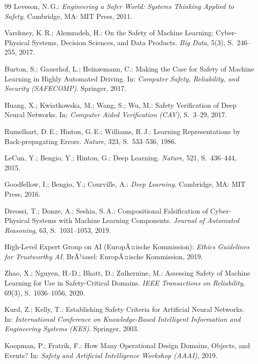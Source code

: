﻿\documentclass[12pt,a4paper]{article}
\begin{document}
\begin{thebibliography}{99}
Leveson, N.\,G.:
\textit{Engineering a Safer World: Systems Thinking Applied to Safety}.
Cambridge, MA: MIT Press, 2011.

Varshney, K.\,R.; Alemzadeh, H.:
On the Safety of Machine Learning: Cyber-Physical Systems, Decision Sciences, and Data Products.
\textit{Big Data}, 5(3), S.~246--255, 2017.

Burton, S.; Gauerhof, L.; Heinzemann, C.:
Making the Case for Safety of Machine Learning in Highly Automated Driving.
In: \textit{Computer Safety, Reliability, and Security (SAFECOMP)}.
Springer, 2017.

Huang, X.; Kwiatkowska, M.; Wang, S.; Wu, M.:
Safety Verification of Deep Neural Networks.
In: \textit{Computer Aided Verification (CAV)}, S.~3--29, 2017.

Rumelhart, D.\,E.; Hinton, G.\,E.; Williams, R.\,J.:
Learning Representations by Back-propagating Errors.
\textit{Nature}, 323, S.~533--536, 1986.

LeCun, Y.; Bengio, Y.; Hinton, G.:
Deep Learning.
\textit{Nature}, 521, S.~436--444, 2015.

Goodfellow, I.; Bengio, Y.; Courville, A.:
\textit{Deep Learning}.
Cambridge, MA: MIT Press, 2016.

Dreossi, T.; Donze, A.; Seshia, S.\,A.:
Compositional Falsification of Cyber-Physical Systems with Machine Learning Components.
\textit{Journal of Automated Reasoning}, 63, S.~1031--1053, 2019.

High-Level Expert Group on AI (EuropÃ¤ische Kommission):
\textit{Ethics Guidelines for Trustworthy AI}.
BrÃ¼ssel: EuropÃ¤ische Kommission, 2019.

Zhao, X.; Nguyen, H.-D.; Bhatt, D.; Zulkernine, M.:
Assessing Safety of Machine Learning for Use in Safety-Critical Domains.
\textit{IEEE Transactions on Reliability}, 69(3), S.~1036--1056, 2020.

Kurd, Z.; Kelly, T.:
Establishing Safety Criteria for Artificial Neural Networks.
In: \textit{International Conference on Knowledge-Based Intelligent Information and Engineering Systems (KES)}.
Springer, 2003.

Koopman, P.; Fratrik, F.:
How Many Operational Design Domains, Objects, and Events?
In: \textit{Safety and Artificial Intelligence Workshop (AAAI)}, 2019.


\end{thebibliography}
\end{document}

